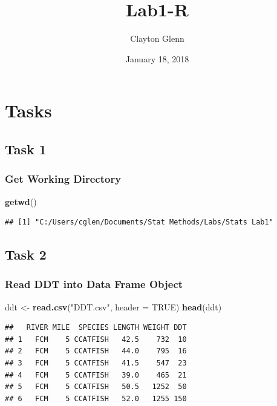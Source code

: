\documentclass[]{article}
\title{Lab1-R}
\author{Clayton Glenn}
\date{January 18, 2018}
\newenvironment{Shaded}{\begin{snugshade}}{\end{snugshade}}
\newcommand{\KeywordTok}[1]{\textcolor[rgb]{0.13,0.29,0.53}{\textbf{#1}}}
\newcommand{\DataTypeTok}[1]{\textcolor[rgb]{0.13,0.29,0.53}{#1}}
\newcommand{\StringTok}[1]{\textcolor[rgb]{0.31,0.60,0.02}{#1}}
\newcommand{\OtherTok}[1]{\textcolor[rgb]{0.56,0.35,0.01}{#1}}
\newcommand{\NormalTok}[1]{#1}
\begin{document}
\maketitle

\section{Tasks}\label{tasks}

\subsection{Task 1}\label{task-1}

\subsubsection{Get Working Directory}\label{get-working-directory}

\begin{Shaded}
\begin{Highlighting}[]
\KeywordTok{getwd}\NormalTok{()}
\end{Highlighting}
\end{Shaded}

\begin{verbatim}
## [1] "C:/Users/cglen/Documents/Stat Methods/Labs/Stats Lab1"
\end{verbatim}

\subsection{Task 2}\label{task-2}

\subsubsection{Read DDT into Data Frame
Object}\label{read-ddt-into-data-frame-object}

\begin{Shaded}
\begin{Highlighting}[]
\NormalTok{ddt <-}\StringTok{ }\KeywordTok{read.csv}\NormalTok{(}\StringTok{"DDT.csv"}\NormalTok{, }\DataTypeTok{header =} \OtherTok{TRUE}\NormalTok{)}
\KeywordTok{head}\NormalTok{(ddt)}
\end{Highlighting}
\end{Shaded}

\begin{verbatim}
##   RIVER MILE  SPECIES LENGTH WEIGHT DDT
## 1   FCM    5 CCATFISH   42.5    732  10
## 2   FCM    5 CCATFISH   44.0    795  16
## 3   FCM    5 CCATFISH   41.5    547  23
## 4   FCM    5 CCATFISH   39.0    465  21
## 5   FCM    5 CCATFISH   50.5   1252  50
## 6   FCM    5 CCATFISH   52.0   1255 150
\end{verbatim}
\end{document}
